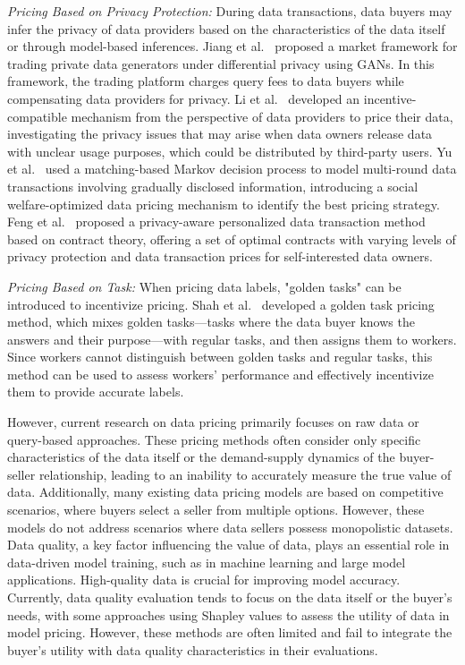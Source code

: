 \textit{Pricing Based on Privacy Protection:} 
During data transactions, data buyers may infer the privacy of data providers based on the characteristics of the data itself or through model-based inferences. Jiang et al.~\cite{ref34} proposed a market framework for trading private data generators under differential privacy using GANs. In this framework, the trading platform charges query fees to data buyers while compensating data providers for privacy. Li et al.~\cite{ref35} developed an incentive-compatible mechanism from the perspective of data providers to price their data, investigating the privacy issues that may arise when data owners release data with unclear usage purposes, which could be distributed by third-party users. Yu et al.~\cite{ref41} used a matching-based Markov decision process to model multi-round data transactions involving gradually disclosed information, introducing a social welfare-optimized data pricing mechanism to identify the best pricing strategy. Feng et al.~\cite{ref75} proposed a privacy-aware personalized data transaction method based on contract theory, offering a set of optimal contracts with varying levels of privacy protection and data transaction prices for self-interested data owners.

\textit{Pricing Based on Task:} 
When pricing data labels, "golden tasks" can be introduced to incentivize pricing. Shah et al.~\cite{ref36} developed a golden task pricing method, which mixes golden tasks—tasks where the data buyer knows the answers and their purpose—with regular tasks, and then assigns them to workers. Since workers cannot distinguish between golden tasks and regular tasks, this method can be used to assess workers' performance and effectively incentivize them to provide accurate labels.

However, current research on data pricing primarily focuses on raw data or query-based approaches. These pricing methods often consider only specific characteristics of the data itself or the demand-supply dynamics of the buyer-seller relationship, leading to an inability to accurately measure the true value of data. Additionally, many existing data pricing models are based on competitive scenarios, where buyers select a seller from multiple options. However, these models do not address scenarios where data sellers possess monopolistic datasets. Data quality, a key factor influencing the value of data, plays an essential role in data-driven model training, such as in machine learning and large model applications. High-quality data is crucial for improving model accuracy. Currently, data quality evaluation tends to focus on the data itself or the buyer's needs, with some approaches using Shapley values to assess the utility of data in model pricing. However, these methods are often limited and fail to integrate the buyer's utility with data quality characteristics in their evaluations.